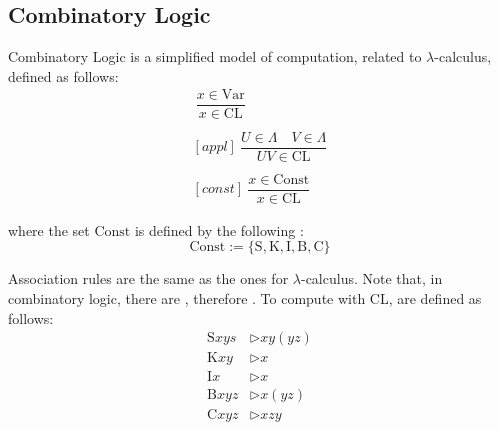 \documentclass[a4paper, 12pt]{report}
\begin{document}
    
    \subsection{Combinatory Logic} \label{comb_logic}

    \begin{frameddefn}{Combinatory Logic}
         is a simplified model of computation, related to $\lambda$-calculus, defined as follows:
        \begin{gather*}
            [var] \ \dfrac{x \in \mathrm{Var}}{x \in \mathrm{CL}} \\ \\
            [appl] \ \dfrac{U \in \Lambda \quad V \in \Lambda}{U V \in \mathrm{CL}} \\ \\
            [const] \ \dfrac{x \in \mathrm{Const}}{x \in \mathrm{CL}}
        \end{gather*}

        where the set $\mathrm{Const}$ is defined by the following : $$\mathrm{Const} := \{\mathrm S, \mathrm K, \mathrm I, \mathrm B, \mathrm C\}$$
    \end{frameddefn}

    Association rules are the same as the ones for $\lambda$-calculus. Note that, in combinatory logic, there are , therefore . To compute with CL,  are defined as follows:
    \begin{equation*}
        \begin{split}
            \mathrm S xys &\triangleright xy(yz) \\
            \mathrm K xy &\triangleright x \\
            \mathrm I x &\triangleright x \\
            \mathrm B xyz &\triangleright x(yz) \\
            \mathrm C xyz &\triangleright xzy
        \end{split}
    \end{equation*}
\end{document}
